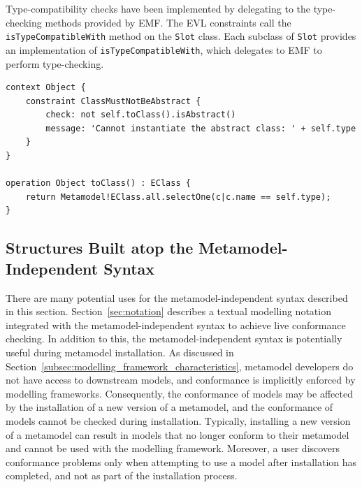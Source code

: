 Type-compatibility checks have been implemented by delegating to the type-checking methods provided by EMF. The EVL constraints call the \texttt{isTy\-peCo\-mp\-at\-ib\-leWi\-th} method on the \texttt{Sl\-ot} class. Each subclass of \texttt{Sl\-ot} provides an implementation of \texttt{isTy\-peCo\-mp\-at\-ib\-leWi\-th}, which delegates to EMF to perform type-checking.

\begin{lstlisting}[caption=A constraint (in EVL) to check that only concrete metamodel types are instantiated., label=lst:conformance_constraint, language=EVL, float=tb]
context Object {
	constraint ClassMustNotBeAbstract {
		check: not self.toClass().isAbstract()
		message: 'Cannot instantiate the abstract class: ' + self.type
	}
}

operation Object toClass() : EClass {
	return Metamodel!EClass.all.selectOne(c|c.name == self.type);
}
\end{lstlisting}


\subsection{Structures Built atop the Metamodel-Independent Syntax}
There are many potential uses for the metamodel-independent syntax described in this section. Section~\ref{sec:notation} describes a textual modelling notation integrated with the metamodel-independent syntax to achieve live conformance checking. In addition to this, the metamodel-independent syntax is potentially useful during metamodel installation. As discussed in Section~\ref{subsec:modelling_framework_characteristics}, metamodel developers do not have access to downstream models, and conformance is implicitly enforced by modelling frameworks. Consequently, the conformance of models may be affected by the installation of a new version of a metamodel, and the conformance of models cannot be checked during installation. Typically, installing a new version of a metamodel can result in models that no longer conform to their metamodel and cannot be used with the modelling framework. Moreover, a user discovers conformance problems only when attempting to use a model after installation has completed, and not as part of the installation process.

